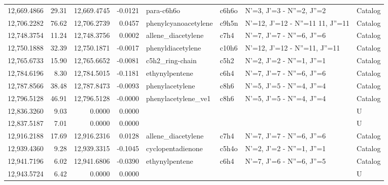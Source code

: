 \begin{longtable}{rrrrllll}
12,669.4866 &     29.31 &       12,669.4745 &   -0.0121 &                  para-c6h6o &   c6h6o &            N'=3, J'=3 - N''=2, J''=2 &    Catalog \\
12,706.2282 &     76.62 &       12,706.2739 &    0.0457 &        phenylcyanoacetylene &   c9h5n &  N'=12, J'=12 - N''=11    11, J''=11 &    Catalog \\
12,748.3754 &     11.24 &       12,748.3756 &    0.0002 &          allene_diacetylene &    c7h4 &            N'=7, J'=7 - N''=6, J''=6 &    Catalog \\
12,750.1888 &     32.39 &       12,750.1871 &   -0.0017 &           phenyldiacetylene &   c10h6 &        N'=12, J'=12 - N''=11, J''=11 &    Catalog \\
12,765.6733 &     15.90 &       12,765.6652 &   -0.0081 &             c5h2_ring-chain &    c5h2 &            N'=2, J'=2 - N''=1, J''=1 &    Catalog \\
12,784.6196 &      8.30 &       12,784.5015 &   -0.1181 &              ethynylpentene &    c6h4 &            N'=7, J'=7 - N''=6, J''=6 &    Catalog \\
12,787.8566 &     38.48 &       12,787.8473 &   -0.0093 &             phenylacetylene &    c8h6 &            N'=5, J'=5 - N''=4, J''=4 &    Catalog \\
12,796.5128 &     46.91 &       12,796.5128 &   -0.0000 &         phenylacetylene_ve1 &    c8h6 &            N'=5, J'=5 - N''=4, J''=4 &    Catalog \\
12,836.3260 &      9.03 &            0.0000 &    0.0000 &                             &         &                                      &          U \\
12,837.5187 &      7.01 &            0.0000 &    0.0000 &                             &         &                                      &          U \\
12,916.2188 &     17.69 &       12,916.2316 &    0.0128 &          allene_diacetylene &    c7h4 &            N'=7, J'=7 - N''=6, J''=6 &    Catalog \\
12,939.4360 &      9.28 &       12,939.3315 &   -0.1045 &           cyclopentadienone &   c5h4o &            N'=2, J'=2 - N''=1, J''=1 &    Catalog \\
12,941.7196 &      6.02 &       12,941.6806 &   -0.0390 &              ethynylpentene &    c6h4 &            N'=7, J'=6 - N''=6, J''=5 &    Catalog \\
12,943.5724 &      6.42 &            0.0000 &    0.0000 &                             &         &                                      &          U \\

\end{longtable}
